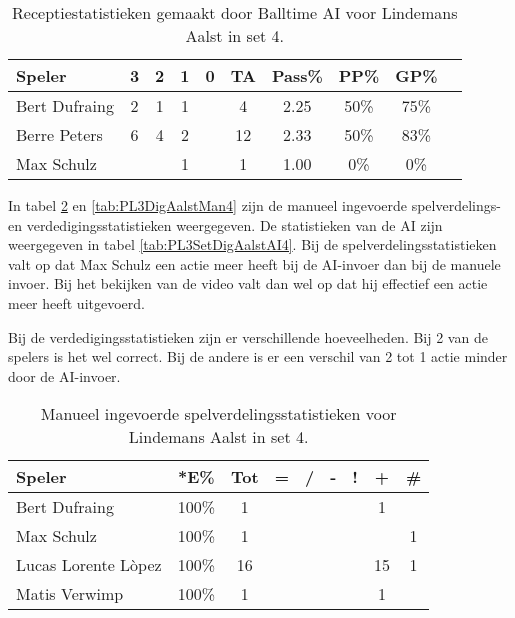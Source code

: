 \begin{table}[ht!]
  \centering
  \scriptsize
    \begin{tabular}{|l|c|c|c|c|c|c|c|c|c|} \hline
    \textbf{Speler} & 3 & 2 & 1 & 0 & TA & Pass\% & PP\% & GP\% \\ \hline
    Bert Dufraing & 2 & 1 & 1 &   & 4 & 2.25 & 50\% & 75\% \\  
    Berre Peters & 6 & 4 & 2 &  & 12 & 2.33 & 50\% & 83\% \\
    Max Schulz &   &  &  1 &  & 1 & 1.00 & 0\% & 0\% \\\hline
  \end{tabular}
  \caption[Receptiestatistieken gemaakt door Balltime AI voor Lindemans Aalst in set 4]{\label{tab:PL3ReceiveAalstAI4}Receptiestatistieken gemaakt door Balltime AI voor Lindemans Aalst in set 4.}
\end{table}

In tabel \ref{tab:PL3SetAalstMan4} en \ref{tab:PL3DigAalstMan4} zijn de manueel ingevoerde spelverdelings- en verdedigingsstatistieken weergegeven. De statistieken van de AI zijn weergegeven in tabel \ref{tab:PL3SetDigAalstAI4}.
Bij de spelverdelingsstatistieken valt op dat Max Schulz een actie meer heeft bij de AI-invoer dan bij de manuele invoer. Bij het bekijken van de video valt dan wel op dat hij effectief een actie meer heeft uitgevoerd. 

Bij de verdedigingsstatistieken zijn er verschillende hoeveelheden. Bij 2 van de spelers is het wel correct. Bij de andere is er een verschil van 2 tot 1 actie minder door de AI-invoer.

\begin{table}[ht!]
    \centering
    \scriptsize
    \begin{tabular}{|l|c|c|c|c|c|c|c|c|}
        \hline
        \textbf{Speler} & *E\% & Tot & = & / & - & ! & + & \# \\ \hline
        Bert Dufraing & 100\% & 1 &  &  &  & & 1 &  \\ 
        Max Schulz & 100\% & 1 &  &  &  & & & 1 \\ 
        Lucas Lorente Lòpez & 100\% & 16 &  &  &  &  & 15 & 1 \\ 
        Matis Verwimp &100\% & 1 & & & & & 1 & \\\hline
    \end{tabular}
    \caption[Manueel ingevoerde spelverdelingsstatistieken voor Lindemans Aalst in set 4]{\label{tab:PL3SetAalstMan4}Manueel ingevoerde spelverdelingsstatistieken voor Lindemans Aalst in set 4.}
\end{table}

